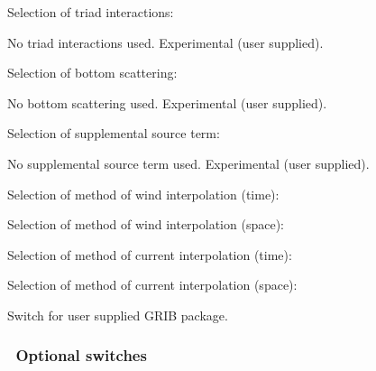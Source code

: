 \noindent
Selection of triad interactions:
\begin{slist}
 {No triad interactions used.}
 {Experimental (user supplied).}
\end{slist}

\noindent
Selection of bottom scattering:
\begin{slist}
 {No bottom scattering used.}
 {Experimental (user supplied).}
\end{slist}

\noindent
Selection of supplemental source term:
\begin{slist}
 {No supplemental source term used.}
 {Experimental (user supplied).}
\end{slist}

\noindent
Selection of method of wind interpolation (time):
\begin{slist}
\end{slist}

\pb \noindent
Selection of method of wind interpolation (space):
\begin{slist}
\end{slist}

\noindent
Selection of method of current interpolation (time):
\begin{slist}
\end{slist}

\noindent
Selection of method of current interpolation (space):
\begin{slist}
\end{slist}

\noindent
Switch for user supplied GRIB package.
\begin{slist}
\end{slist}


\vsssub
\subsubsection{~Optional switches} \label{sub:opt_switch}
\vsssub

